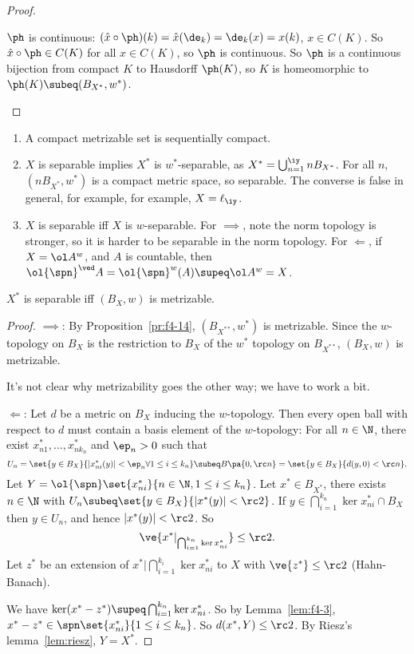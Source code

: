 \begin{proof}
\begin{enumerate}
$\ph$ is continuous: $(\hat x\circ \ph)(k)=\hat x(\de_k)=\de_k(x)=x(k)$, $x\in C(K)$. So $\hat x\circ \ph\in C(K)$ for all $x\in C(K)$, so $\ph$ is continuous. So $\ph$ is a continuous bijection from compact $K$ to Hausdorff $\ph(K)$, so $K$ is homeomorphic to $\ph(K)\subeq (B_{X^*},w^*)$.
\end{enumerate}
\end{proof}
\begin{rem}
\begin{enumerate}
\item A compact metrizable set is sequentially compact.
\item $X$ is separable implies $X^*$ is $w^*$-separable, as $X^*=\bigcup_{n=1}^{\iy} nB_{X^*}$. For all $n$, $(nB_{X^*}, w^*)$ is a compact metric space, so separable. The converse is false in general, for example, for example, $X=\ell_{\iy}$. 
\item
$X$ is separable iff $X$ is $w$-separable. For $\implies$, note the norm topology is stronger, so it is harder to be separable in the norm topology. For $\Leftarrow$, if $X=\ol A^w$, and $A$ is countable, then $\ol{\spn}^{\ved}A=\ol{\spn}^w(A)\supeq \ol A^w=X$.
\end{enumerate}
\end{rem}
\begin{pr}
$X^*$ is separable iff $(B_X,w)$ is metrizable.
\end{pr}
\begin{proof}
$\implies$: By Proposition~\ref{pr:f4-14}, $(B_{X^{**}}, w^*)$ is metrizable. Since the $w$-topology on $B_X$ is the restriction to $B_X$ of the $w^*$ topology on $B_{X^{**}}$, $(B_X,w)$ is metrizable.


It's not clear why metrizability goes the other way; we have to work a bit.

$\Leftarrow$: Let $d$ be a metric on $B_X$ inducing the $w$-topology. Then every open ball with respect to $d$ must contain a basis element of the $w$-topology: 
For all $n\in \N$, there exist $x_{n1}^*,\ldots, x_{n{k_n}}^*$ and $\ep_n>0$ such that 
\[
U_n=\set{y\in B_X}{|x_{ni}^*(y)|<\ep_n\forall 1\le i\le k_n}\subeq B\pa{0,\rc n} =\set{y\in B_X}{d(y,0)<\rc n}.
\]
Let $Y=\ol{\spn}\set{x_{ni}^*}{n\in \N,1\le i\le k_n}$. Let $x^*\in B_{X^*}$, there exists $n\in \N$ with $U_n\subeq \set{y\in B_X}{|x^*(y)|<\rc 2}$. If $y\in \bigcap_{i=1}^{k_n} \ker x_{ni}^*\cap B_X$ then $y\in U_n$, and hence $|x^*(y)|<\rc 2$. So \[\ve{x^*|_{\bigcap_{i=1}^{k_n}\ker x_{ni}^*}}\le \rc 2.\] Let $z^*$ be an extension of $x^*|\bigcap_{i=1}^{k_i}\ker x_{ni}^*$ to $X$ with $\ve{z^*}\le \rc 2$ (Hahn-Banach). 

We have $\ker (x^*-z^*)\supeq \bigcap_{i=1}^{k_n} \ker x_{ni}^*$. So by Lemma~\ref{lem:f4-3}, $x^*-z^*\in \spn\set{x_{ni}^*}{1\le i\le k_n}$. So $d(x^*,Y)\le\rc2$. By Riesz's lemma~\ref{lem:riesz}, $Y=X^*$. 
\end{proof}
